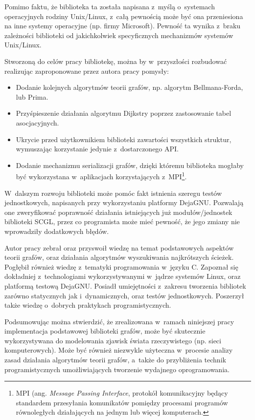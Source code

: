 \documentclass[a4paper,12pt,polish,oneside,openright]{thesis}
\begin{document}
Pomimo faktu, że biblioteka ta została napisana z~myślą o~systemach operacyjnych rodziny Unix/Linux, z~całą pewnością może być ona przeniesiona na inne systemy operacyjne (np. firmy Microsoft).
Pewność ta wynika z~braku zależności biblioteki od jakichkolwiek specyficznych mechanizmów systemów Unix/Linux.

Stworzoną do celów pracy bibliotekę, można by w~przyszłości rozbudować realizując zaproponowane przez autora pracy pomysły:
\begin{itemize}
	\item Dodanie kolejnych algorytmów teorii grafów, np. algorytm Bellmana-Forda, lub Prima.
	\item Przyśpieszenie działania algorytmu Dijkstry poprzez zastosowanie tabel asocjacyjnych.
	\item Ukrycie przed użytkownikiem biblioteki zawartości wszystkich struktur, wymuszając korzystanie jedynie z~dostarczonego API.
	\item Dodanie mechanizmu serializacji grafów, dzięki któremu biblioteka mogłaby być wykorzystana w~aplikacjach korzystających z~MPI\footnote{MPI (ang. \emph{Message Passing Interface}, protokół komunikacyjny będący standardem przesyłania komunikatów pomiędzy procesami programów równoległych działających na jednym lub więcej komputerach.}.
\end{itemize}
W~dalszym rozwoju biblioteki może pomóc fakt istnienia szeregu testów jednostkowych, napisanych przy wykorzystaniu platformy DejaGNU. Pozwalają one zweryfikować poprawność działania istniejących już modułów/jednostek biblioteki SCGL, przez co programista może mieć pewność, że jego zmiany nie wprowadziły dodatkowych błędów.

Autor pracy zebrał oraz przyswoił wiedzę na temat podstawowych aspektów teorii grafów, oraz działania algorytmów wyszukiwania najkrótszych ścieżek.
Pogłębił również wiedzę z~tematyki programowania w~języku C.
Zapoznał się dokładniej z~technologiami wykorzystywanymi w~jądrze systemów Linux, oraz platformą testową DejaGNU.
Posiadł umiejętności z~zakresu tworzenia bibliotek zarówno statycznych jak i~dynamicznych, oraz testów jednostkowych.
Poszerzył także wiedzę o~dobrych praktykach programistycznych.

Podsumowując można stwierdzić, że zrealizowana w~ramach niniejszej pracy implementacja podstawowej biblioteki grafów, może być skutecznie wykorzystywana do modelowania zjawisk świata rzeczywistego (np. sieci komputerowych).
Może być również niezwykle użyteczna w~procesie analizy zasad działania algorytmów teorii grafów, a~także do przybliżenia technik programistycznych umożliwiających tworzenie wydajnego oprogramowania.
\end{document}
